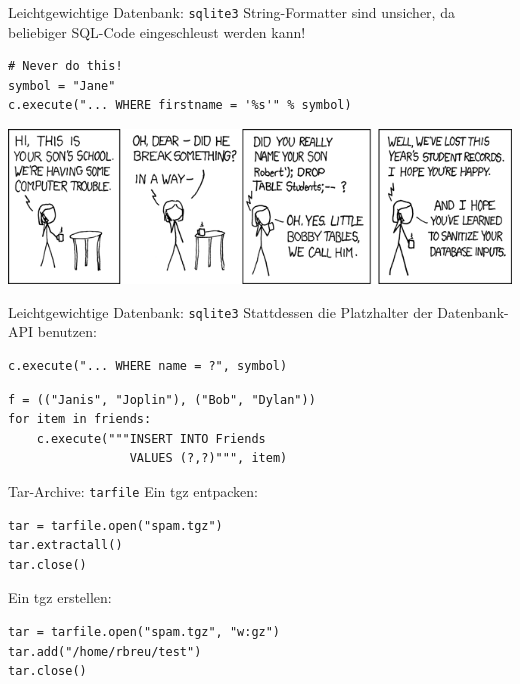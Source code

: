 \begin{frame}[fragile]{Leichtgewichtige Datenbank: \texttt{sqlite3}}
String-Formatter sind unsicher, da beliebiger SQL-Code eingeschleust werden kann!
\begin{lstlisting}[style=Python]
# Never do this!
symbol = "Jane"
c.execute("... WHERE firstname = '%s'" % symbol)
\end{lstlisting}
\vspace{2mm}
\includegraphics[width=\textwidth]{images/exploits_of_a_mom.png}
\end{frame}

\begin{frame}[fragile]{Leichtgewichtige Datenbank: \texttt{sqlite3}}
Stattdessen die Platzhalter der Datenbank-API benutzen:
\begin{lstlisting}[style=Python]
c.execute("... WHERE name = ?", symbol)
\end{lstlisting}
\begin{lstlisting}[style=Python]
f = (("Janis", "Joplin"), ("Bob", "Dylan"))
for item in friends:
    c.execute("""INSERT INTO Friends 
                 VALUES (?,?)""", item)
\end{lstlisting}
\end{frame}

\begin{frame}[fragile]{Tar-Archive: \texttt{tarfile}}
Ein tgz entpacken:
\begin{lstlisting}[style=Python]
tar = tarfile.open("spam.tgz")
tar.extractall()
tar.close()
\end{lstlisting}
\vspace*{3mm}
Ein tgz erstellen:
\begin{lstlisting}[style=Python]
tar = tarfile.open("spam.tgz", "w:gz")
tar.add("/home/rbreu/test")
tar.close()
\end{lstlisting}
\end{frame}


